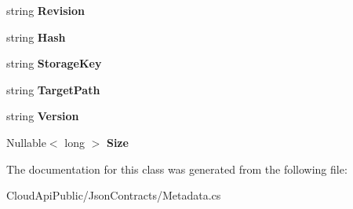 \begin{DoxyCompactItemize}
\item 
\hypertarget{class_cloud_api_public_1_1_json_contracts_1_1_metadata_af9aa0e7f317a8a62b67e50a90126563f}{string {\bfseries Revision}}\label{class_cloud_api_public_1_1_json_contracts_1_1_metadata_af9aa0e7f317a8a62b67e50a90126563f}

\item 
\hypertarget{class_cloud_api_public_1_1_json_contracts_1_1_metadata_ae8b25ae85583bbd67c0a48e23fe2cd8f}{string {\bfseries Hash}}\label{class_cloud_api_public_1_1_json_contracts_1_1_metadata_ae8b25ae85583bbd67c0a48e23fe2cd8f}

\item 
\hypertarget{class_cloud_api_public_1_1_json_contracts_1_1_metadata_a4d24bd562656a014ed4aad7ea08a457b}{string {\bfseries Storage\-Key}}\label{class_cloud_api_public_1_1_json_contracts_1_1_metadata_a4d24bd562656a014ed4aad7ea08a457b}

\item 
\hypertarget{class_cloud_api_public_1_1_json_contracts_1_1_metadata_a804de698cb66be5f353744508d6cfdb3}{string {\bfseries Target\-Path}}\label{class_cloud_api_public_1_1_json_contracts_1_1_metadata_a804de698cb66be5f353744508d6cfdb3}

\item 
\hypertarget{class_cloud_api_public_1_1_json_contracts_1_1_metadata_a78e30603c5d7e62ec252fee301b6d4ad}{string {\bfseries Version}}\label{class_cloud_api_public_1_1_json_contracts_1_1_metadata_a78e30603c5d7e62ec252fee301b6d4ad}

\item 
\hypertarget{class_cloud_api_public_1_1_json_contracts_1_1_metadata_a319df2814cfb507aab29b83abe753557}{Nullable$<$ long $>$ {\bfseries Size}}\label{class_cloud_api_public_1_1_json_contracts_1_1_metadata_a319df2814cfb507aab29b83abe753557}

\end{DoxyCompactItemize}


The documentation for this class was generated from the following file\-:\begin{DoxyCompactItemize}
\item 
Cloud\-Api\-Public/\-Json\-Contracts/Metadata.\-cs\end{DoxyCompactItemize}
